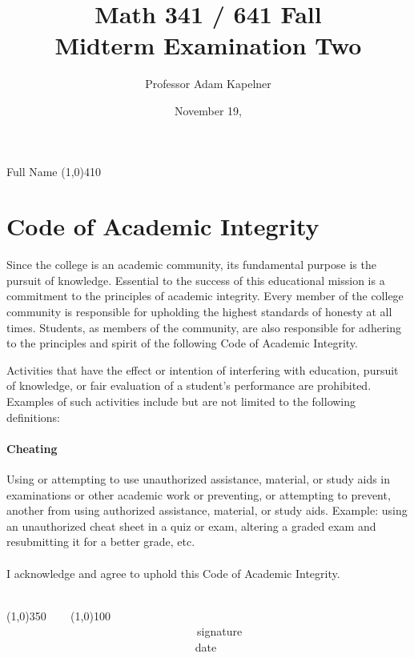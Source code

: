 \documentclass[12pt]{article}
\title{Math 341 / 641 Fall \the\year{} \\ Midterm Examination Two}
\author{Professor Adam Kapelner}
\date{November 19, \the\year{}}
\begin{document}
\maketitle

\noindent Full Name \line(1,0){410}

\thispagestyle{empty}

\section*{Code of Academic Integrity}

\footnotesize
Since the college is an academic community, its fundamental purpose is the pursuit of knowledge. Essential to the success of this educational mission is a commitment to the principles of academic integrity. Every member of the college community is responsible for upholding the highest standards of honesty at all times. Students, as members of the community, are also responsible for adhering to the principles and spirit of the following Code of Academic Integrity.

Activities that have the effect or intention of interfering with education, pursuit of knowledge, or fair evaluation of a student's performance are prohibited. Examples of such activities include but are not limited to the following definitions:

\paragraph{Cheating} Using or attempting to use unauthorized assistance, material, or study aids in examinations or other academic work or preventing, or attempting to prevent, another from using authorized assistance, material, or study aids. Example: using an unauthorized cheat sheet in a quiz or exam, altering a graded exam and resubmitting it for a better grade, etc.\\
\\
\noindent I acknowledge and agree to uphold this Code of Academic Integrity. \\~\\

\begin{center}
\line(1,0){350} ~~~ \line(1,0){100}\\
~~~~~~~~~~~~~~~~~~~~~~~~~~~~~~~~~~signature~~~~~~~~~~~~~~~~~~~~~~~~~~~~~~~~~~~~~~~~~~~~~~~~~~~~~~~~~~~~~~ date
\end{center}

\normalsize
\end{document}
